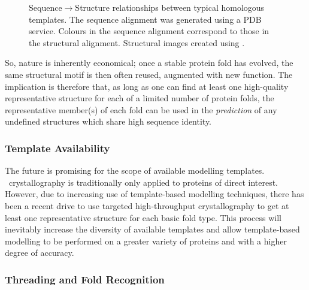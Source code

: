 \begin{figure}[p]
\begin{center}
{{\begin{minipage}{0.2\textwidth}
\begin{tiny}
\begin{tabbing}
\end{tabbing}
\end{tiny}
\end{minipage}
}}

\vspace{0.5cm}

\caption[Sequence:Structure relationships between homologous templates]{Sequence$\to$Structure relationships between typical homologous templates. The sequence alignment
was generated using a PDB  service. Colours in the sequence alignment correspond to those in the structural alignment. Structural images created using \pymolV.
}
\label{fig:intro:seqstrucrelationship}

\end{center}
\end{figure}

So, nature is inherently economical; once a stable protein fold has evolved, the same structural motif is then often reused, augmented with new function.
The implication is therefore that, as long as one can find at least one high-quality representative structure for each of a limited number
of protein folds, the representative member(s) of each fold can be used in the \emph{prediction} of any undefined structures which share high sequence
identity.




\subsubsection{Template Availability}

The future is promising for the scope of available 
modelling templates. \xray\ crystallography is traditionally only applied to proteins of direct interest. However, due to increasing use of template-based
modelling techniques, there has been a recent drive to use targeted high-throughput crystallography to get at least one representative structure for each basic
fold type\cite{COMPCHEM:Gou2002}. This process will inevitably increase the diversity of available templates and allow template-based modelling to be performed on a greater variety of proteins and with a higher degree of accuracy.


\subsubsection{Threading and Fold Recognition}

